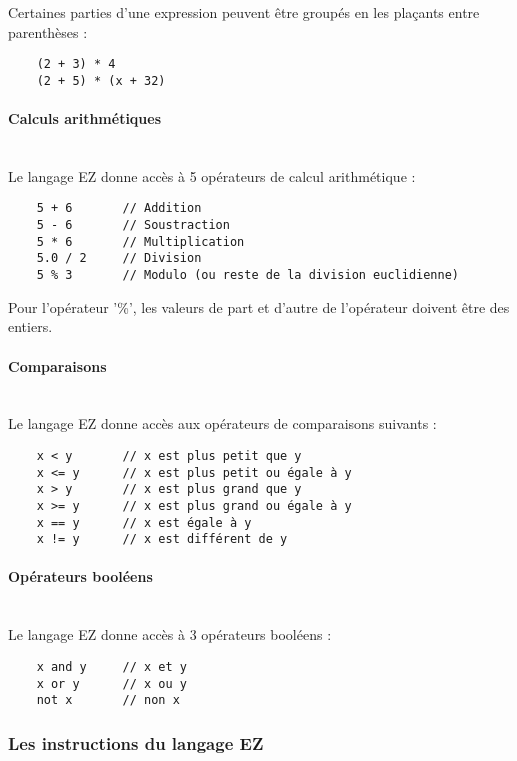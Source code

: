 Certaines parties d'une expression peuvent être groupés en les plaçants
entre parenthèses :
\begin{verbatim}
    (2 + 3) * 4
    (2 + 5) * (x + 32)
\end{verbatim}

\paragraph{Calculs arithmétiques}\mbox{} \\

Le langage EZ donne accès à 5 opérateurs de calcul arithmétique :
\begin{verbatim}
    5 + 6       // Addition
    5 - 6       // Soustraction
    5 * 6       // Multiplication
    5.0 / 2     // Division
    5 % 3       // Modulo (ou reste de la division euclidienne)
\end{verbatim}

Pour l'opérateur '\%', les valeurs de part et d'autre de l'opérateur doivent
être des entiers.

\paragraph{Comparaisons}\mbox{} \\

Le langage EZ donne accès aux opérateurs de comparaisons suivants :
\begin{verbatim}
    x < y       // x est plus petit que y
    x <= y      // x est plus petit ou égale à y
    x > y       // x est plus grand que y
    x >= y      // x est plus grand ou égale à y
    x == y      // x est égale à y
    x != y      // x est différent de y
\end{verbatim}

\paragraph{Opérateurs booléens}\mbox{} \\

Le langage EZ donne accès à 3 opérateurs booléens :
\begin{verbatim}
    x and y     // x et y
    x or y      // x ou y
    not x       // non x
\end{verbatim}




\subsubsection{Les instructions du langage EZ}

